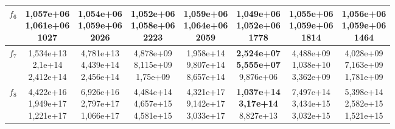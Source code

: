 \begin{table}[t]
\begin{small}
\begin{tabular}{|c|c|c|c|c|c|c|c|}
        $f_6$    & \makecell{1,057e+06 \\ 1,061e+06 \\ 1027}      & \makecell{1,054e+06 \\ 1,059e+06 \\ 2026}      & \makecell{1,052e+06 \\ 1,058e+06 \\ 2223}      & \makecell{1,059e+06 \\ 1,064e+06 \\ 2059}      & \makecell{\textbf{1,049e+06} \\ \textbf{1,052e+06} \\ 1778}      & \makecell{1,055e+06 \\ 1,059e+06 \\ 1814}      & \makecell{1,056e+06 \\ 1,059e+06 \\ 1464}      \\\hline
        $f_7$    & \makecell{1,534e+13 \\ 2,1e+14 \\ 2,412e+14}   & \makecell{4,781e+13 \\ 4,439e+14 \\ 2,456e+14} & \makecell{4,878e+09 \\ 8,115e+09 \\ 1,75e+09}  & \makecell{1,958e+14 \\ 9,807e+14 \\ 8,657e+14} & \makecell{\textbf{2,524e+07} \\ \textbf{5,555e+07} \\ 9,876e+06} & \makecell{4,488e+09 \\ 1,038e+10 \\ 3,362e+09} & \makecell{4,028e+09 \\ 7,163e+09 \\ 1,781e+09} \\\hline
        $f_8$    & \makecell{4,422e+16 \\ 1,949e+17 \\ 1,221e+17} & \makecell{6,926e+16 \\ 2,797e+17 \\ 1,066e+17} & \makecell{4,484e+14 \\ 4,657e+15 \\ 4,581e+15} & \makecell{4,321e+17 \\ 9,142e+17 \\ 3,033e+17} & \makecell{\textbf{1,037e+14} \\ \textbf{3,17e+14} \\ 8,827e+13}  & \makecell{7,497e+14 \\ 3,434e+15 \\ 3,032e+15} & \makecell{5,398e+14 \\ 2,582e+15 \\ 1,521e+15} \\\hline

\end{tabular}
\end{small}
\end{table}
